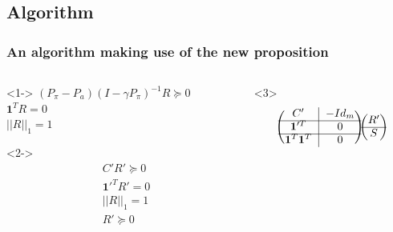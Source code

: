 \documentclass{beamer}
\begin{document}
\subsection{Algorithm}
\label{sec-3_2}
\begin{frame}
\frametitle{An algorithm making use of the new proposition}
\begin{columns}
\begin{column}{.45\textwidth}
\begin{block}<1->{}
  $(P_\pi-P_{a})(I-\gamma P_\pi)^{-1}R\succeq 0$\\
  $\mathbf{1}^TR =  0$\\
  $||R||_1 = 1$  
\end{block}
\begin{block}<2->{}
  \begin{eqnarray*}
  &C'R' \succeq 0 \\
  &\mathbf{1}'^TR'=0\\
  &||R||_1=1\\
  &R'\succeq 0\\
  \end{eqnarray*}
\end{block}
\end{column}
\begin{column}{.45\textwidth}
\begin{block}<3>{}
  \begin{eqnarray*}
  \label{LPStandardForm.eqn}
  \begin{blockarray}{(cc)}
  \begin{block*}{c|c}
  C'& -Id_m  \\
  \cline{1-2}
  \begin{block*}{c|c}
  \mathbf{1}'^T&0 \\
  \end{block*}
  \cline{1-2}
  \begin{block*}{c|c}
  \mathbf{1}^T\mathbf{1}^T&0 \\
  \end{block*}
  \end{block*}
  \end{blockarray} 
  \begin{blockarray}{(c)}
  \begin{block*}{c}
  R' \\
  \cline{1-1}
  \begin{block*}{c}
  S\\
  \end{block*}
  \end{block*}
  \end{blockarray}

\end{eqnarray*}
\end{block}
\end{column}
\end{columns}
\end{frame}
\end{document}
